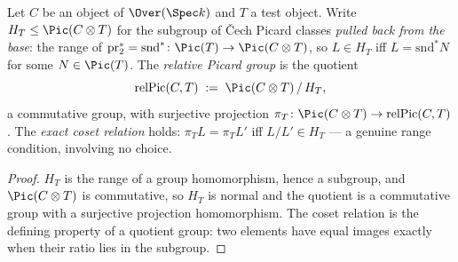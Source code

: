 \begin{definition}
  \label{pa-def:relPic}
  \leanok

  Let \(C\) be an object of \(\Over(\Spec k)\) and \(T\) a test object. Write
  \(H_T \le \Pic(C \otimes T)\) for the subgroup of \v Cech Picard classes \emph{pulled back
  from the base}: the range of \(\mathrm{pr}_2^{*} = \mathrm{snd}^{*} \colon \Pic(T) \to
  \Pic(C \otimes T)\), so \(L \in H_T\) iff \(L = \mathrm{snd}^{*} N\) for some
  \(N \in \Pic(T)\). The \emph{relative Picard group} is the quotient
  \[
    \mathrm{relPic}(C,T) \;:=\; \Pic(C \otimes T) \,/\, H_T ,
  \]
  a commutative group, with surjective projection \(\pi_T \colon \Pic(C \otimes T) \to
  \mathrm{relPic}(C,T)\). The \emph{exact coset relation} holds: \(\pi_T L = \pi_T L'\) iff
  \(L / L' \in H_T\) — a genuine range condition, involving no choice.
\end{definition}
\begin{proof}
  \leanok
  \(H_T\) is the range of a group homomorphism, hence a subgroup, and \(\Pic(C \otimes T)\)
  is commutative, so \(H_T\) is normal and the quotient is a commutative group with a
  surjective projection homomorphism. The coset relation is the defining property of a
  quotient group: two elements have equal images exactly when their ratio lies in the
  subgroup.
\end{proof}


